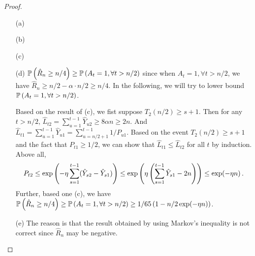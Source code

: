 \begin{proof}
\begin{enumerate}
    \item[(a)]
    \item[(b)]
    \item[(c)]
    \item[(d)]
    $\mathbb{P} \left(\hat{R}_n\ge n/4\right)\ge \mathbb{P} \left(A_t=1,\forall t>n/2\right)$ since when $A_t=1,\forall t>n/2$, we have $\hat{R}_n\ge n/2-\alpha\cdot n/2 \ge n/4$. In the following, we will try to lower bound $\mathbb{P} \left(A_t=1,\forall t>n/2\right)$. 
    
    Based on the result of (c), we fist suppose $T_2(n/2)\ge s+1$. Then for any $t>n/2$, $\hat{L}_{t2}=\sum_{u=1}^{t-1}\hat{Y}_{u2}\ge 8\alpha n\ge 2n$. And $\hat{L}_{t1}=\sum_{u=1}^{t-1}\hat{Y}_{u1}=\sum_{u=n/2+1}^{t-1} 1/P_{u1}$. 
    Based on the event $T_2(n/2)\ge s+1$ and the fact that $P_{t1}\ge 1/2$, we can show that $\hat{L}_{t1}\le \hat{L}_{t2}$ for all $t$ by induction.
    Above all, 
    \begin{align*}
        P_{t2}\le \exp\left( -\eta\sum_{s=1}^{t-1}(\hat{Y}_{s2}-\hat{Y}_{s1}) \right) \le \exp \left( \eta\left( \sum_{s=1}^{t-1}\hat{Y}_{s1}-2n\right) \right)\le \exp(-\eta n)\,.
    \end{align*}
    Further, based one (c), we have $\mathbb{P} \left(\hat{R}_n\ge n/4\right)\ge \mathbb{P} \left(A_t=1,\forall t>n/2\right) \ge 1/65\left( 1-n/2\exp(-\eta n) \right)$.
    \item[(e)] The reason is that the result obtained by using Markov's inequality is not correct since $\hat{R}_n$ may be negative. 
    

\end{enumerate}
\end{proof}
